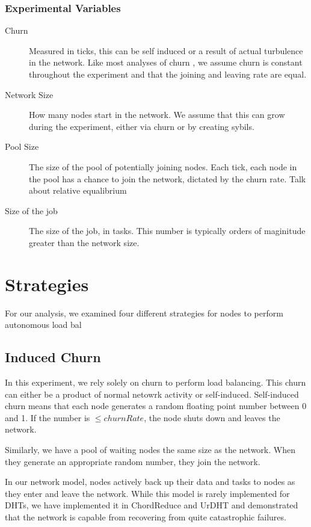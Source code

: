 \subsubsection{Experimental Variables}
\begin{description}
	\item [Churn] Measured in ticks, this can be self induced or a result of actual turbulence in the network.
	Like most analyses of churn \cite{marozzo2012p2p}, we assume churn is constant throughout the experiment and that the joining and leaving rate are equal.
	\item [Network Size]  How many nodes start in the network.  
		We assume that this can grow during the experiment, either via churn or by creating sybils.
	\item [Pool Size]  The size of the pool of potentially joining nodes.  Each tick, each node in the pool has a chance to join the network, dictated by the churn rate.
		Talk about relative equalibrium
	\item [Size of the job] The size of the job, in tasks.
		This number is typically orders of maginitude greater than the network size.
\end{description}


\section{Strategies}

For our analysis, we examined four different strategies for nodes to perform autonomous load bal



\subsection{Induced Churn}
In this experiment, we rely solely on churn to perform load balancing.
This churn can either be a product of normal netowrk activity or self-induced.
Self-induced churn means that each node generates a random floating point number between 0 and 1.
If the number is $\leq churnRate$, the node shuts down and leaves the network.

Similarly, we have a pool of waiting nodes the same size as the network.
When they generate an appropriate random number, they join the network.

In our network model, nodes actively back up their data and tasks to nodes as they enter and leave the network.
While this model is rarely implemented for DHTs, we have implemented it in ChordReduce\cite{chordreduce} and UrDHT\cite{urdht} and demonstrated that the network is capable from recovering from quite catastrophic failures.

